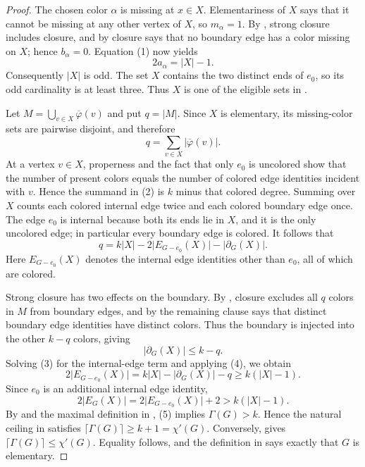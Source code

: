\begin{proof}
The chosen color $\alpha$ is missing at $x\in X$.  Elementariness of $X$
says that it cannot be missing at any other vertex of $X$, so
$m_\alpha=1$.  By , strong closure
includes closure, and by  closure says that
no boundary edge has a color missing on $X$; hence $b_\alpha=0$.  Equation
(1) now yields
\[
                      2a_\alpha=|X|-1.
\]
Consequently $|X|$ is odd.  The set $X$ contains the two distinct ends of
$e_0$, so its odd cardinality is at least three.  Thus $X$ is one of the
eligible sets in .

Let $M=\bigcup_{v\in X}\overline\varphi(v)$ and put $q=|M|$.  Since $X$
is elementary, its missing-color sets are pairwise disjoint, and therefore
\[
              q=\sum_{v\in X}|\overline\varphi(v)|. \tag{2}
\]
At a vertex $v\in X$, properness and the fact that only $e_0$ is uncolored
show that the number of present colors equals the number of colored edge
identities incident with $v$.  Hence the summand in (2) is $k$ minus that
colored degree.  Summing over $X$ counts each colored internal edge twice
and each colored boundary edge once.  The edge $e_0$ is internal because
both its ends lie in $X$, and it is the only uncolored edge; in particular
every boundary edge is colored.  It follows that
\[
 q=k|X|-2\bigl|E_{G-e_0}(X)\bigr|-|\partial_G(X)|. \tag{3}
\]
Here $E_{G-e_0}(X)$ denotes the internal edge identities other than $e_0$,
all of which are colored.

Strong closure has two effects on the boundary.  By
, closure excludes all $q$ colors in $M$
from boundary edges, and by  the
remaining clause says that distinct boundary edge identities have distinct
colors.  Thus the boundary is injected into the other $k-q$ colors, giving
\[
                       |\partial_G(X)|\leq k-q.       \tag{4}
\]
Solving (3) for the internal-edge term and applying (4), we obtain
\[
 2\bigl|E_{G-e_0}(X)\bigr|
   =k|X|-|\partial_G(X)|-q
   \geq k(|X|-1).
\]
Since $e_0$ is an additional internal edge identity,
\[
 2|E_G(X)|=2\bigl|E_{G-e_0}(X)\bigr|+2
          >k(|X|-1).                                  \tag{5}
\]
By  and the maximal definition in
, (5) implies $\Gamma(G)>k$.  Hence the natural ceiling in
 satisfies
$\lceil\Gamma(G)\rceil\geq k+1=\chi'(G)$.  Conversely,
 gives
$\lceil\Gamma(G)\rceil\leq\chi'(G)$.  Equality follows, and the definition
in  says exactly that $G$ is elementary.
\end{proof}
